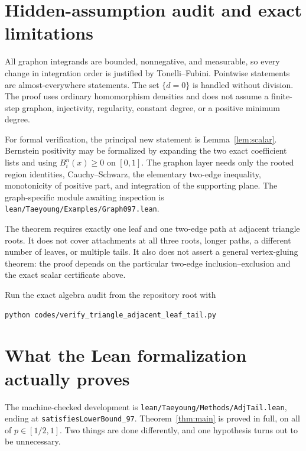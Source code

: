 \documentclass[11pt]{article}
\begin{document}
\section{Hidden-assumption audit and exact limitations}

All graphon integrands are bounded, nonnegative, and measurable, so every
change in integration order is justified by Tonelli--Fubini.  Pointwise
statements are almost-everywhere statements.  The set $\{d=0\}$ is handled
without division.  The proof uses ordinary homomorphism densities and does
not assume a finite-step graphon, injectivity, regularity, constant degree,
or a positive minimum degree.

For formal verification, the principal new statement is
Lemma~\ref{lem:scalar}.  Bernstein positivity may be formalized by expanding
the two exact coefficient lists and using $B_i^n(x)\geq0$ on $[0,1]$.
The graphon layer needs only the rooted region identities, Cauchy--Schwarz,
the elementary two-edge inequality, monotonicity of positive part, and
integration of the supporting plane.  The graph-specific module awaiting
inspection is \texttt{lean/Taeyoung/Examples/Graph097.lean}.

The theorem requires exactly one leaf and one two-edge path at adjacent
triangle roots.  It does not cover attachments at all three roots, longer
paths, a different number of leaves, or multiple tails.  It also does not
assert a general vertex-gluing theorem: the proof depends on the particular
two-edge inclusion--exclusion and the exact scalar certificate above.

Run the exact algebra audit from the repository root with
\begin{verbatim}
python codes/verify_triangle_adjacent_leaf_tail.py
\end{verbatim}

\section{What the Lean formalization actually proves}

The machine-checked development is
\texttt{lean/Taeyoung/Methods/AdjTail.lean}, ending at
\texttt{satisfiesLowerBound\_97}.  Theorem~\ref{thm:main} is proved in full, on
all of $p\in[1/2,1]$.  Two things are done differently, and one hypothesis turns
out to be unnecessary.
\end{document}
